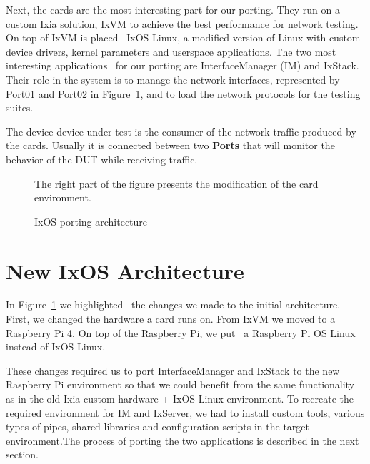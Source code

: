 Next, the cards are the most interesting part for our porting. They run on a
custom Ixia solution, IxVM to achieve the best performance for network testing. On top
of IxVM is placed~ IxOS Linux, a modified version of Linux with custom
device drivers, kernel parameters and userspace applications. The two most
interesting applications~ for our porting are InterfaceManager (IM) and IxStack.
Their role in the system is to manage the network interfaces, represented by
Port01 and Port02 in Figure~\ref{fig:ixos_arch}, and to load the network
protocols for the testing suites.

The device device under test is the consumer of the network traffic produced by
the cards. Usually it is connected between two \textbf{Ports} that will monitor the
behavior of the DUT while receiving traffic.

\begin{figure}
    \centering
    \def\svgscale{0.95}
    
    \caption{IxOS porting architecture}
    \label{fig:ixos_arch}
    \medskip
    \small
    The right part of the figure presents the modification of the card
    environment.~
\end{figure}

\section{New IxOS Architecture}

In Figure~\ref{fig:ixos_arch} we highlighted~ the changes we made to the initial
architecture. First, we changed the hardware a card runs on. From IxVM we moved
to a Raspberry Pi 4. On top of the Raspberry Pi, we put~ a Raspberry Pi OS Linux
instead of IxOS Linux.

These changes required us to port InterfaceManager and IxStack to the new
Raspberry Pi environment so that we could benefit from the same functionality as
in the old Ixia custom hardware + IxOS Linux environment. To recreate the
required environment for IM and IxServer, we had to install custom tools,
various types of pipes, shared libraries and configuration scripts in the target
environment.The process of porting the two applications is described in the next
section.

